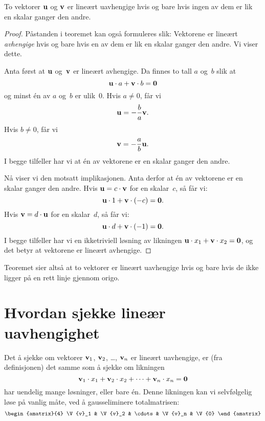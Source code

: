 \begin{thm}
\label{thm:lin-uavh-2}
To vektorer $\mathbf{u}$ og $\mathbf{v}$ er lineært uavhengige hvis og bare
hvis ingen av dem er lik en skalar ganger den andre.
\end{thm}
\begin{proof}
Påstanden i teoremet kan også formuleres slik: Vektorene er lineært
\emph{avhengige} hvis og bare hvis en av dem er lik en skalar ganger
den andre.  Vi viser dette.

Anta først at $\mathbf{u}$ og~$\mathbf{v}$ er lineært avhengige.  Da finnes
to tall $a$ og~$b$ slik at
\[
\mathbf{u} \cdot a + \mathbf{v} \cdot b = \mathbf{0}
\]
og minst én av $a$ og~$b$ er ulik~$0$.  Hvis $a \ne 0$, får vi
\[
\mathbf{u} = - \frac{b}{a} \mathbf{v}.
\]
Hvis $b \ne 0$, får vi
\[
\mathbf{v} = - \frac{a}{b} \mathbf{u}.
\]
I begge tilfeller har vi at én av vektorene er en skalar ganger den
andre.

Nå viser vi den motsatt implikasjonen.  Anta derfor at én av vektorene
er en skalar ganger den andre.  Hvis $\mathbf{u} = c \cdot \mathbf{v}$ for en
skalar~$c$, så får vi:
\[
\mathbf{u} \cdot 1 + \mathbf{v} \cdot (-c) = \mathbf{0}.
\]
Hvis $\mathbf{v} = d \cdot \mathbf{u}$ for en skalar~$d$, så får vi:
\[
\mathbf{u} \cdot d + \mathbf{v} \cdot (-1) = \mathbf{0}.
\]
I begge tilfeller har vi en ikketriviell løsning av likningen
$\mathbf{u} \cdot x_1 + \mathbf{v} \cdot x_2 = \mathbf{0}$,
og det betyr at vektorene er lineært avhengige.
\end{proof}

Teoremet sier altså at to vektorer er lineært uavhengige hvis og bare
hvis de ikke ligger på en rett linje gjennom origo.




\section*{Hvordan sjekke lineær uavhengighet}

Det å sjekke om vektorer $\mathbf{v}_1$, $\mathbf{v}_2$, \ldots, $\mathbf{v}_n$ er
lineært uavhengige, er (fra definisjonen) det samme som å sjekke om
likningen
\[
\mathbf{v}_1 \cdot x_1 + \mathbf{v}_2 \cdot x_2 + \cdots + \mathbf{v}_n \cdot x_n = \mathbf{0}
\]
har uendelig mange løsninger, eller bare én.  Denne likningen kan vi
selvfølgelig løse på vanlig måte, ved å gausseliminere totalmatrisen:
\[
\begin{amatrix}{4}
\V{v}_1 & \V{v}_2 & \cdots & \V{v}_n & \V{0}
\end{amatrix}
\]



